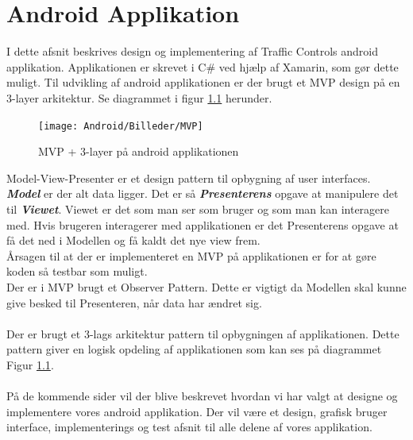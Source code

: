 \chapter{Android Applikation}
	I dette afsnit beskrives design og implementering af Traffic Controls android applikation. 
	Applikationen er skrevet i C\# ved hjælp af Xamarin\cite{XamarinDoc}, som gør dette muligt.
	Til udvikling af android applikationen er der brugt et MVP design på en 3-layer arkitektur. Se diagrammet i figur \ref{fig:MVP} herunder.
	
	\begin{figure} [!ht]
		\begin{center}
			\texttt{[image: Android/Billeder/MVP]}
		\end{center}
		\caption{MVP + 3-layer på android applikationen}
		\label{fig:MVP}
	\end{figure}
	\pagebreak
	\noindent Model-View-Presenter er et design pattern til opbygning af user interfaces. \textbf{\emph{Model}} er der alt data ligger. Det er så \textbf{\emph{Presenterens}} opgave at manipulere det til \textbf{\emph{Viewet}}. Viewet er det som man ser som bruger og som man kan interagere med. Hvis brugeren interagerer med applikationen er det Presenterens opgave at få det ned i Modellen og få kaldt det nye view frem. \\
	Årsagen til at der er implementeret en MVP på applikationen er for at gøre koden så testbar som muligt. \\
	Der er i MVP brugt et Observer Pattern. Dette er vigtigt da Modellen skal kunne give besked til Presenteren, når data har ændret sig.
	\\
	\\
	Der er brugt et 3-lags arkitektur pattern til opbygningen af applikationen. Dette pattern giver en logisk opdeling af applikationen som kan ses på diagrammet Figur \ref{fig:MVP}.
	\\
	\\
	På de kommende sider vil der blive beskrevet hvordan vi har valgt at designe og implementere vores android applikation. Der vil være et design, grafisk bruger interface, implementerings og test afsnit til alle delene af vores applikation.
	\pagebreak
	
